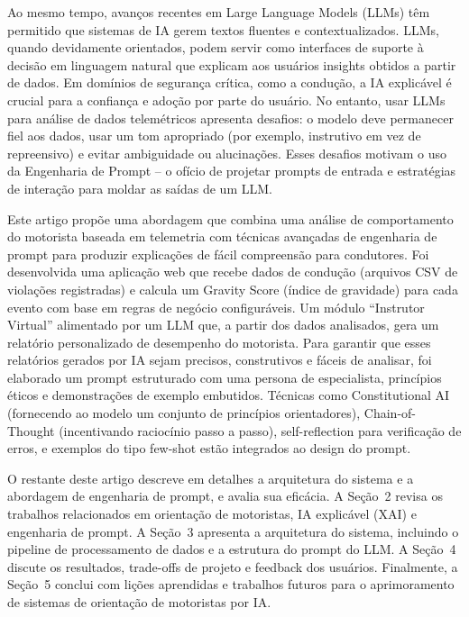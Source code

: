 \documentclass[12pt]{article}
\begin{document}
Ao mesmo tempo, avanços recentes em Large Language Models (LLMs) têm permitido que sistemas de IA gerem textos fluentes e contextualizados. LLMs, quando devidamente orientados, podem servir como interfaces de suporte à decisão em linguagem natural que explicam aos usuários insights obtidos a partir de dados. Em domínios de segurança crítica, como a condução, a IA explicável é crucial para a confiança e adoção por parte do usuário. No entanto, usar LLMs para análise de dados telemétricos apresenta desafios: o modelo deve permanecer fiel aos dados, usar um tom apropriado (por exemplo, instrutivo em vez de repreensivo) e evitar ambiguidade ou alucinações. Esses desafios motivam o uso da Engenharia de Prompt – o ofício de projetar prompts de entrada e estratégias de interação para moldar as saídas de um LLM.

Este artigo propõe uma abordagem que combina uma análise de comportamento do motorista baseada em telemetria com técnicas avançadas de engenharia de prompt para produzir explicações de fácil compreensão para condutores. Foi desenvolvida uma aplicação web que recebe dados de condução (arquivos CSV de violações registradas) e calcula um Gravity Score (índice de gravidade) para cada evento com base em regras de negócio configuráveis. Um módulo “Instrutor Virtual” alimentado por um LLM que, a partir dos dados analisados, gera um relatório personalizado de desempenho do motorista. Para garantir que esses relatórios gerados por IA sejam precisos, construtivos e fáceis de analisar, foi elaborado um prompt estruturado com uma persona de especialista, princípios éticos e demonstrações de exemplo embutidos. Técnicas como Constitutional AI (fornecendo ao modelo um conjunto de princípios orientadores), Chain-of-Thought (incentivando raciocínio passo a passo), self-reflection para verificação de erros, e exemplos do tipo few-shot estão integrados ao design do prompt.

O restante deste artigo descreve em detalhes a arquitetura do sistema e a abordagem de engenharia de prompt, e avalia sua eficácia. A Seção 2 revisa os trabalhos relacionados em orientação de motoristas, IA explicável (XAI) e engenharia de prompt. A Seção 3 apresenta a arquitetura do sistema, incluindo o pipeline de processamento de dados e a estrutura do prompt do LLM. A Seção 4 discute os resultados, trade-offs de projeto e feedback dos usuários. Finalmente, a Seção 5 conclui com lições aprendidas e trabalhos futuros para o aprimoramento de sistemas de orientação de motoristas por IA.
\end{document}
